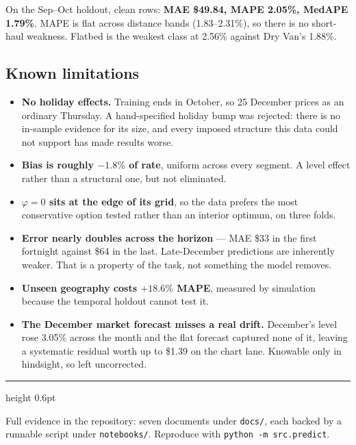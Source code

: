 \documentclass[11pt,a4paper]{article}
\newcommand{\key}[1]{\textbf{\color{spotter}#1}}
\begin{document}
On the Sep--Oct holdout, clean rows: \key{MAE \$49.84, MAPE 2.05\%, MedAPE 1.79\%}.
MAPE is flat across distance bands (1.83--2.31\%), so there is no short-haul
weakness. Flatbed is the weakest class at 2.56\% against Dry Van's 1.88\%.

\subsection{Known limitations}

\begin{itemize}\itemsep3pt
\item \textbf{No holiday effects.} Training ends in October, so 25 December prices
as an ordinary Thursday. A hand-specified holiday bump was rejected: there is no
in-sample evidence for its size, and every imposed structure this data could not
support has made results worse.
\item \textbf{Bias is roughly $-1.8\%$ of rate}, uniform across every segment.
A level effect rather than a structural one, but not eliminated.
\item \textbf{$\varphi = 0$ sits at the edge of its grid}, so the data prefers the
most conservative option tested rather than an interior optimum, on three folds.
\item \textbf{Error nearly doubles across the horizon} --- MAE \$33 in the first
fortnight against \$64 in the last. Late-December predictions are inherently
weaker. That is a property of the task, not something the model removes.
\item \textbf{Unseen geography costs $+18.6\%$ MAPE}, measured by simulation
because the temporal holdout cannot test it.
\item \textbf{The December market forecast misses a real drift.} December's level
rose 3.05\% across the month and the flat forecast captured none of it, leaving a
systematic residual worth up to \$1.39 on the chart lane. Knowable only in
hindsight, so left uncorrected.
\end{itemize}

\vspace{6pt}
\hrule height 0.6pt
\vspace{6pt}

{\small Full evidence in the repository: seven documents under \texttt{docs/},
each backed by a runnable script under \texttt{notebooks/}. Reproduce with
\texttt{python -m src.predict}.}
\end{document}

